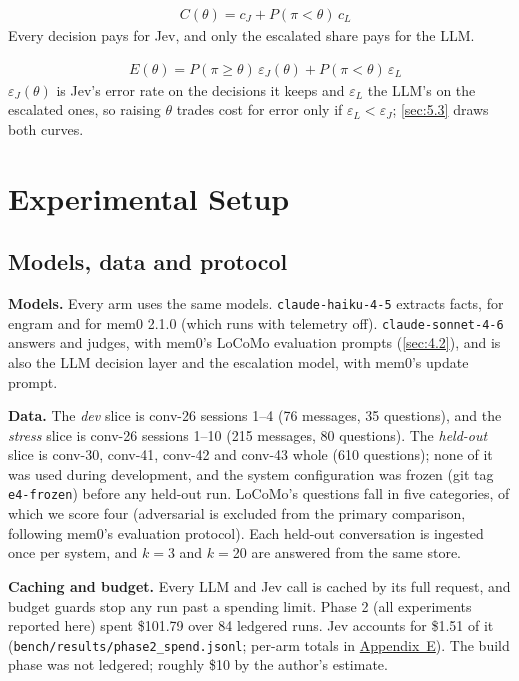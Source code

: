 \documentclass[11pt]{article}
\newcommand{\src}[1]{}
\begin{document}
\begin{align}
& C(\theta) = c_J + P(\pi < \theta)\, c_L \label{eq:cost}
\end{align}
Every decision pays for Jev, and only the escalated share pays for the LLM.

\begin{align}
& E(\theta) = P(\pi \ge \theta)\, \varepsilon_J(\theta) + P(\pi < \theta)\, \varepsilon_L \label{eq:error}
\end{align}
$\varepsilon_J(\theta)$ is Jev's error rate on the decisions it keeps and $\varepsilon_L$ the LLM's on the escalated ones, so raising $\theta$ trades cost for error only if $\varepsilon_L < \varepsilon_J$; \cref{sec:5.3} draws both curves.

\section{Experimental Setup}\label{sec:4}
\subsection{Models, data and protocol}\label{sec:4.1}
\textbf{Models.} Every arm uses the same models. \texttt{claude-haiku-4-5} extracts facts, for engram and for mem0 2.1.0 (which runs with telemetry off). \texttt{claude-sonnet-4-6} answers and judges, with mem0's LoCoMo evaluation prompts (\cref{sec:4.2}), and is also the LLM decision layer and the escalation model, with mem0's update prompt.

\textbf{Data.} The \emph{dev} slice is conv-26 sessions 1--4 (76\src{bench/results/e2\_jev\_\_dev.json} messages, 35\src{bench/results/e2\_jev\_\_dev.json} questions), and the \emph{stress} slice is conv-26 sessions 1--10 (215\src{bench/results/e2\_jev\_\_stress.json} messages, 80\src{bench/results/e2\_jev\_\_stress.json} questions). The \emph{held-out} slice is conv-30, conv-41, conv-42 and conv-43 whole (610\src{bench/results/heldout\_report.json} questions); none of it was used during development, and the system configuration was frozen (git tag \texttt{e4-frozen}) before any held-out run. LoCoMo's questions fall in five categories, of which we score four (adversarial is excluded from the primary comparison, following mem0's evaluation protocol). Each held-out conversation is ingested once per system, and $k{=}$3 and $k{=}$20 are answered from the same store.

\textbf{Caching and budget.} Every LLM and Jev call is cached by its full request, and budget guards stop any run past a spending limit. Phase 2 (all experiments reported here) spent \$101.79\src{bench/results/phase2\_spend.jsonl} over 84\src{bench/results/phase2\_spend.jsonl} ledgered runs. Jev accounts for \$1.51\src{bench/results/phase2\_spend.jsonl} of it (\texttt{bench/\allowbreak{}results/\allowbreak{}phase2\_\allowbreak{}spend.jsonl}; per-arm totals in \hyperref[app:E]{Appendix~E}). The build phase was not ledgered; roughly \$10 by the author's estimate.
\end{document}
